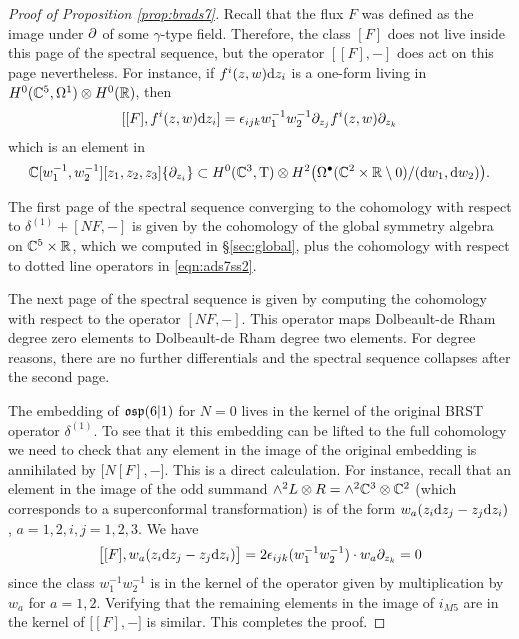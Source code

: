 \begin{proof}[Proof of Proposition \ref{prop:brads7}]
Recall that the flux $F$ was defined as the image under $\partial$ of some $\gamma$-type field. 
Therefore, the class $[F]$ does not live inside this page of the spectral sequence, but the operator $[[F], -]$ does act on this page nevertheless. 
For instance, if $f^i(z,w) {\rm d} z_i$ is a one-form living in $H^0(\mathbb C^5, \Omega^1) \otimes H^0(\mathbb R)$, then
\[
[ [F] , f^i (z,w) {\rm d} z_i ] = \epsilon_{ijk} w_1^{-1} w_2^{-1} \partial_{z_j} f^i(z,w) \partial_{z_k} 
\]
which is an element in 
\[
\mathbb C[w_1^{-1}, w_2^{-1}][z_1,z_2,z_3] \{\partial_{z_i}\} \subset H^0(\mathbb C^3, {\rm T}) \otimes H^2 \big(\Omega^\bullet(\mathbb C^2 \times \mathbb R \setminus 0) / ({\rm d} w_1 , {\rm d} w_2) \big) .
\]

The first page of the spectral sequence converging to the cohomology with respect to $\delta^{(1)} + [N F, -]$ is given by the cohomology of the global symmetry algebra on $\mathbb C^5 \times \mathbb R$, which we computed in \S \ref{sec:global}, plus the cohomology with respect to dotted line operators in \eqref{eqn:ads7ss2}. 

The next page of the spectral sequence is given by computing the cohomology with respect to the operator $[N F,-]$. 
This operator maps Dolbeault-de Rham degree zero elements to Dolbeault-de Rham degree two elements. 
For degree reasons, there are no further differentials and the spectral sequence collapses after the second page. 

The embedding of $\mathfrak{osp}(6|1)$ for $N=0$ lives in the kernel of the original BRST operator $\delta^{(1)}$. 
To see that it this embedding can be lifted to the full cohomology we need to check that any element in the image of the original embedding is annihilated by $\big[ N [F] , - \big]$. 
This is a direct calculation. 
For instance, recall that an element in the image of the odd summand $\wedge^2 L \otimes R = \wedge^2 \mathbb C^3 \otimes \mathbb C^2$ (which corresponds to a superconformal transformation) is of the form $w_a (z_i {\rm d} z_j - z_j {\rm d} z_i)$, $a=1,2, i,j=1,2,3$. 
We have
\[
\big[[F] , w_a (z_i {\rm d} z_j - z_j {\rm d} z_i)\big] = 2 \epsilon_{ijk} (w_1^{-1} w_2^{-1}) \cdot w_a \partial_{z_k} = 0
\]
since the class $w_1^{-1} w_2^{-1}$ is in the kernel of the operator given by multiplication by $w_a$ for $a=1,2$.
Verifying that the remaining elements in the image of $i_{M5}$ are in the kernel of $\big[ [F], -\big]$ is similar.
This completes the proof.
\end{proof}

